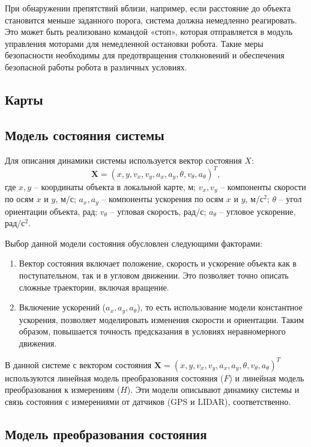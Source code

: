 При обнаружении препятствий вблизи, например, если расстояние до объекта
становится меньше заданного порога, система должна немедленно реагировать. Это
может быть реализовано командой «стоп», которая отправляется в модуль управления
моторами для немедленной остановки робота. Такие меры безопасности необходимы
для предотвращения столкновений и обеспечения безопасной работы робота в
различных условиях.


\subsection{Карты}


\subsection{Модель состояния системы}

Для описания динамики системы используется вектор состояния \(X\):
\[
\mathbf{X} = (x, y, v_x, v_y, a_x, a_y, \theta, v_\theta, a_\theta)^T,
\]
где
     $x, y$ -- координаты объекта в локальной карте, м;
     $v_x, v_y$ -- компоненты скорости по осям $x$ и $y$, м/с;
     $a_x, a_y$ -- компоненты ускорения по осям $x$ и $y$, м/с${}^2$;
     $\theta$ -- угол ориентации объекта, $рад$;
     $v_\theta$ -- угловая скорость, рад/с;
     $a_\theta$ -- угловое ускорение, рад/с${}^2$.

Выбор данной модели состояния обусловлен следующими факторами:
\begin{enumerate}[label=\arabic*]
    \item Вектор состояния включает положение, скорость и ускорение объекта как в поступательном, так и в угловом движении. 
	   Это позволяет точно описать сложные траектории, включая вращение.
    \item Включение ускорений ($a_x, a_y, a_\theta$), то есть использование модели константное ускорения,
	  позволяет моделировать изменения скорости и ориентации. Таким образом,
	повышается точность предсказания в условиях неравномерного движения.
\end{enumerate}

В данной системе с вектором состояния 
\(\mathbf{X} = (x, y, v_x, v_y, a_x, a_y, \theta, v_\theta, a_\theta)^T\)
используются линейная модель преобразования состояния (\(F\)) и линейная модель преобразования к измерениям (\(H\)).
Эти модели описывают динамику системы и связь состояния с измерениями от датчиков (GPS и LIDAR), соответственно.

\subsection{Модель преобразования состояния}
\label{subsec:state_transition}

